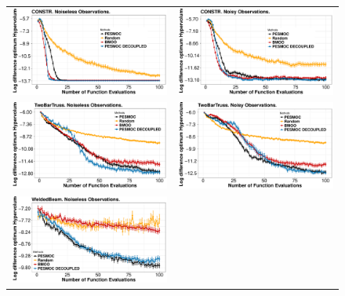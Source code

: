 \begin{figure}[H]
        \begin{tabular}{cc}
                \vspace{-.2cm}
                \includegraphics[width=0.475\linewidth]{Figures/benchmark/CONSTR.pdf} &
                \includegraphics[width=0.475\linewidth]{Figures/benchmark/CONSTR_noisy.pdf} \\
                \includegraphics[width=0.475\linewidth]{Figures/benchmark/TwoBarTruss.pdf} &
                \includegraphics[width=0.475\linewidth]{Figures/benchmark/TwoBarTruss_noisy.pdf} \\
                \includegraphics[width=0.475\linewidth]{Figures/benchmark/WeldedBeam.pdf} &

\end{tabular}
\end{figure}

